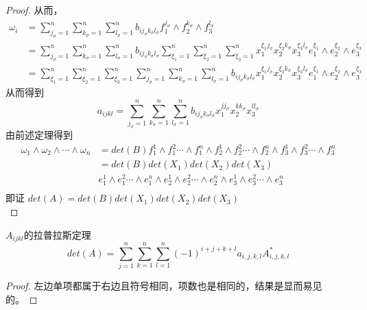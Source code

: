 \documentclass[twoside,a4paper,CCT]{cctart}   %
\begin{document}
\begin{proof}
从而，
\begin{equation}
\begin{aligned}
\omega_{i}
&= \sum_{j_{\sigma}=1}^{n}\sum_{k_{\sigma}=1}^{n}\sum_{l_{\sigma}=1}^{n} b_{ij_{\sigma}k_{\sigma}l_{\sigma}} f_{1}^{j_{\sigma}} \wedge f_{2}^{k_{\sigma}} \wedge f_{3}^{l_{\sigma}} \\
&= \sum_{j_{\sigma}=1}^{n}\sum_{k_{\sigma}=1}^{n}\sum_{l_{\sigma}=1}^{n} b_{ij_{\sigma}k_{\sigma}l_{\sigma}}
\sum_{\xi_{1}=1}^{n}\sum_{\xi_{2}=1}^{n}\sum_{\xi_{3}=1}^{n}x_{1}^{\xi_{1}j_{\sigma}}x_{2}^{\xi_{2}k_{\sigma}}x_{3}^{\xi_{3}l_{\sigma}}e_{1}^{\xi_{1}}\wedge e_{2}^{\xi_{2}}\wedge e_{3}^{\xi_{3}}\\
&= \sum_{\xi_{1}=1}^{n}\sum_{\xi_{2}=1}^{n}\sum_{\xi_{3}=1}^{n}\sum_{j_{\sigma}=1}^{n}\sum_{k_{\sigma}=1}^{n}\sum_{l_{\sigma}=1}^{n}b_{ij_{\sigma}k_{\sigma}l_{\sigma}}
x_{1}^{\xi_{1}j_{\sigma}}x_{2}^{\xi_{2}k_{\sigma}}x_{3}^{\xi_{3}l_{\sigma}}e_{1}^{\xi_{1}}\wedge e_{2}^{\xi_{2}}\wedge e_{3}^{\xi_{3}}
\end{aligned}\end{equation}
从而得到
$$a_{ijkl}=\sum_{j_{\sigma}=1}^{n}\sum_{k_{\sigma}=1}^{n}\sum_{l_{\sigma}=1}^{n}b_{ij_{\sigma}k_{\sigma}l_{\sigma}}x_{1}^{jj_{\sigma}}x_{2}^{kk_{\sigma}}x_{3}^{ll_{\sigma}}$$
由前述定理得到
\begin{equation}
\begin{aligned}
\omega_{1}\wedge\omega_{2}\wedge\cdots\wedge\omega_{n}
& = det(B) f_{1}^1\wedge f_{1}^2 \cdots \wedge f_{1}^n \wedge f_{2}^1\wedge f_{2}^2 \cdots \wedge f_{2}^n
\wedge f_{3}^1\wedge f_{3}^2 \cdots \wedge f_{3}^n\\
& = det(B)det(X_{1})det(X_{2})det(X_{3}) \\
&e_{1}^1\wedge e_{1}^2 \cdots \wedge e_{1}^n \wedge e_{2}^1\wedge e_{2}^2 \cdots \wedge e_{2}^n
\wedge e_{3}^1\wedge e_{3}^2 \cdots \wedge e_{3}^n\\
\end{aligned}
\end{equation}
即证 $det(A) = det(B)det(X_{1})det(X_{2})det(X_{3})$
\\
\end{proof}

\begin{theorem}  $A_{ijkl}$的拉普拉斯定理
$$det(A)=\sum\limits_{j=1}^n \sum\limits_{k=1}^n \sum\limits_{l=1}^n (-1)^{i+j+k+l} a_{i,j,k,l} A^{*}_{i,j,k,l} $$
\end{theorem}
\begin{proof}
左边单项都属于右边且符号相同，项数也是相同的，结果是显而易见的。
\end{proof}
\end{document}
